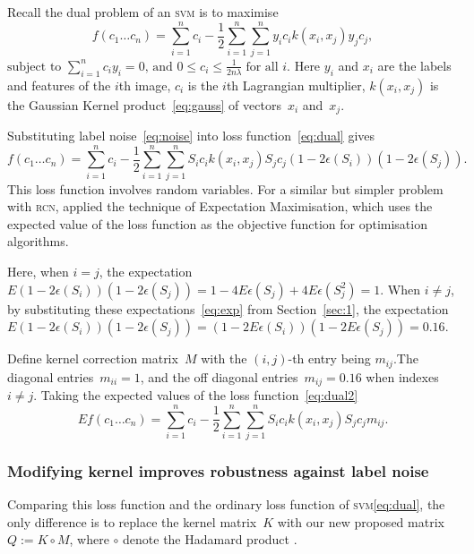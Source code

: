 \documentclass[12pt]{article} %
\newcommand{\svm}{\textsc{svm}}
\begin{document}
Recall the dual problem of an \textsc{svm} is to maximise
\begin{equation}
   f(c_{1}\ldots c_{n})=\sum _{i=1}^{n}c_{i}-{\frac {1}{2}}\sum _{i=1}^{n}\sum _{j=1}^{n}y_{i}c_{i}k(x_{i},x_{j})y_{j}c_{j}, \label{eq:dual}
\end{equation}
\begin{math}
{\text{subject to }}\sum _{i=1}^{n}c_{i}y_{i}=0,\,{\text{and }}0\leq c_{i}\leq {\frac {1}{2n\lambda }}\;{\text{for all }}i. 
\end{math} 
Here $y_i$ and $x_i$ are the labels and features of the $i$th image, $c_i$ is the $i$th Lagrangian multiplier, $k(x_i,x_j)$ is the Gaussian Kernel product~\eqref{eq:gauss} of vectors~$x_i$ and~$x_j$.

Substituting label noise~\eqref{eq:noise} into loss function~\eqref{eq:dual} gives
\begin{equation}
   f(c_{1}\ldots c_{n})=\sum _{i=1}^{n}c_{i}-{\frac {1}{2}}\sum _{i=1}^{n}\sum _{j=1}^{n}S_{i}c_{i}k(x_{i},x_{j})S_{j}c_{j}(1-2\epsilon(S_i))(1-2\epsilon(S_j)). \label{eq:dual2}
\end{equation}
This loss function involves random variables. For a similar  but simpler problem with \textsc{rcn}, \citet{pmlr-v20-biggio11} applied the technique of Expectation Maximisation, which uses the expected value of the loss function as the objective function for optimisation algorithms.

Here, when $i=j$, the expectation~$E(1-2\epsilon(S_i))(1-2\epsilon(S_j))=1-4E\epsilon(S_j)+4E\epsilon(S_j^2)=1$. 
When $i\neq j$, by substituting these expectations~\eqref{eq:exp} from Section~\ref{sec:1}, the expectation~$E(1-2\epsilon(S_i))(1-2\epsilon(S_j))=(1-2E\epsilon(S_i))(1-2E\epsilon(S_j))=0.16$. 

Define kernel correction matrix~$M$ with the $(i,j)$-th entry being $m_{ij}$.The diagonal entries~$m_{ii}=1 $, and the off diagonal entries~$m_{ij}=0.16$ when indexes~$i\neq j$. Taking the expected values of the loss function~\eqref{eq:dual2}
\begin{equation}
   Ef(c_{1}\ldots c_{n})=\sum _{i=1}^{n}c_{i}-{\frac {1}{2}}\sum _{i=1}^{n}\sum _{j=1}^{n}S_{i}c_{i}k(x_{i},x_{j})S_{j}c_{j}m_{ij}. \label{eq:dual3}
\end{equation}

\subsubsection{Modifying kernel improves robustness against label noise}
Comparing this loss function and the ordinary loss function of \svm \eqref{eq:dual}, the only difference is to replace the kernel matrix~$K$ with our new proposed matrix~$Q:=K\circ M$, where $\circ$ denote the Hadamard product \citep{hastie01statisticallearning}.
\end{document}
